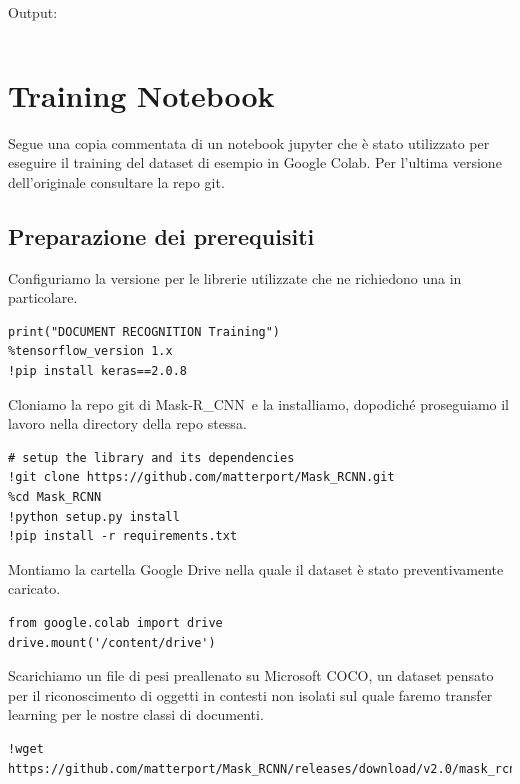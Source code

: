 \documentclass[12pt,a4paper]{article}
\newcommand{\mrcnn}{Mask-R\_CNN}
\begin{document}
Output:
\inputminted{python}{test\_background.py}

\pagebreak

\section{Training Notebook}


Segue una copia commentata di un notebook jupyter che è stato utilizzato
per eseguire il training del dataset di esempio in Google Colab. Per
l'ultima versione dell'originale consultare la repo git.

\subsection{Preparazione dei prerequisiti}

Configuriamo la versione per le librerie utilizzate che ne richiedono
una in particolare.

\begin{verbatim}
print("DOCUMENT RECOGNITION Training")
%tensorflow_version 1.x
!pip install keras==2.0.8
\end{verbatim}

Cloniamo la repo git di \mrcnn\ e la installiamo, dopodiché proseguiamo
il lavoro nella directory della repo stessa.

\begin{verbatim}
# setup the library and its dependencies
!git clone https://github.com/matterport/Mask_RCNN.git
%cd Mask_RCNN
!python setup.py install
!pip install -r requirements.txt
\end{verbatim}

Montiamo la cartella Google Drive nella quale il dataset è stato
preventivamente caricato.

\begin{verbatim}
from google.colab import drive
drive.mount('/content/drive')
\end{verbatim}

Scarichiamo un file di pesi preallenato su Microsoft COCO, un dataset
pensato per il riconoscimento di oggetti in contesti non isolati sul
quale faremo transfer learning per le nostre classi di documenti.

\begin{verbatim}
!wget https://github.com/matterport/Mask_RCNN/releases/download/v2.0/mask_rcnn_coco.h5
\end{verbatim}
\end{document}
